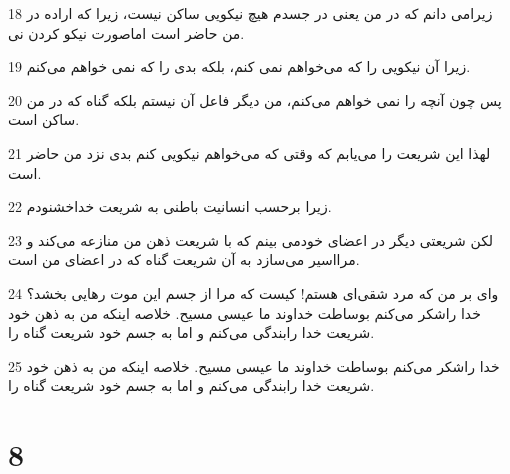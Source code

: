 \par 18 زیرامی دانم که در من یعنی در جسدم هیچ نیکویی ساکن نیست، زیرا که اراده در من حاضر است اماصورت نیکو کردن نی.
\par 19 زیرا آن نیکویی را که می‌خواهم نمی کنم، بلکه بدی را که نمی خواهم می‌کنم.
\par 20 پس چون آنچه را نمی خواهم می‌کنم، من دیگر فاعل آن نیستم بلکه گناه که در من ساکن است.
\par 21 لهذا این شریعت را می‌یابم که وقتی که می‌خواهم نیکویی کنم بدی نزد من حاضر است.
\par 22 زیرا برحسب انسانیت باطنی به شریعت خداخشنودم.
\par 23 لکن شریعتی دیگر در اعضای خودمی بینم که با شریعت ذهن من منازعه می‌کند و مرااسیر می‌سازد به آن شریعت گناه که در اعضای من است.
\par 24 وای بر من که مرد شقی‌ای هستم! کیست که مرا از جسم این موت رهایی بخشد؟خدا راشکر می‌کنم بوساطت خداوند ما عیسی مسیح. خلاصه اینکه من به ذهن خود شریعت خدا رابندگی می‌کنم و اما به جسم خود شریعت گناه را.
\par 25 خدا راشکر می‌کنم بوساطت خداوند ما عیسی مسیح. خلاصه اینکه من به ذهن خود شریعت خدا رابندگی می‌کنم و اما به جسم خود شریعت گناه را.

\chapter{8}

